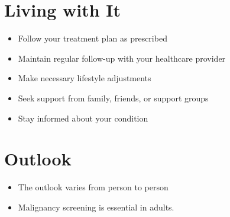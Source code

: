 \section{Living with It}
\begin{itemize}[noitemsep]
  \item Follow your treatment plan as prescribed
  \item Maintain regular follow-up with your healthcare provider
  \item Make necessary lifestyle adjustments
  \item Seek support from family, friends, or support groups
  \item Stay informed about your condition
\end{itemize}
\section{Outlook}
\begin{itemize}[noitemsep]
  \item The outlook varies from person to person
  \item Malignancy screening is essential in adults.
\end{itemize}
